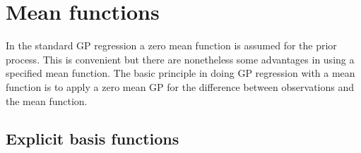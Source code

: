 \documentclass[twoside,11pt]{article}
\begin{document}
\section{Mean functions}
\label{cha:mean-functions}

In the standard GP regression a zero mean function is assumed for
the prior process. This is convenient but there are nonetheless
some advantages in using a specified mean function. The basic
principle in doing GP regression with a mean function is to apply a
zero mean GP for the difference between observations and the mean
function.

\subsection{Explicit basis functions}
\end{document}
